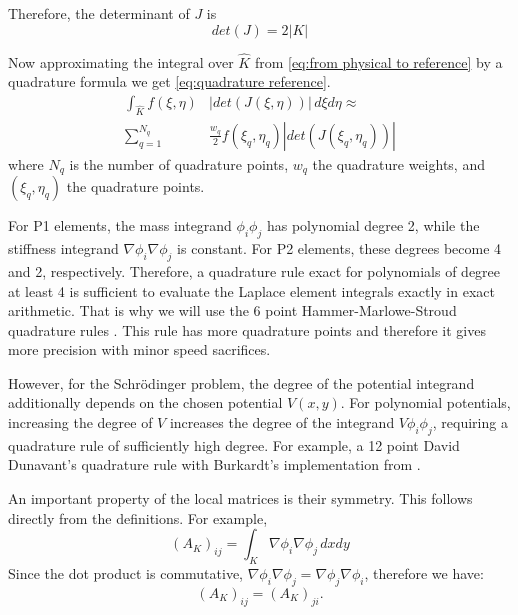 \documentclass[conference]{IEEEtran}
\begin{document}
Therefore, the determinant of $J$ is
\begin{equation}
    det(J) = 2|K|
\end{equation}

Now approximating the integral over $\hat{K}$ from \ref{eq:from physical to reference} by a quadrature formula we get \ref{eq:quadrature reference}.
\begin{equation}
\begin{aligned}
    \int_{\hat{K}}f(\xi, \eta) &|det(J(\xi, \eta))| \, d\xi d\eta \approx \\
    \sum_{q=1}^{N_q} &\frac{w_q}{2} f(\xi_q, \eta_q) |det(J(\xi_q, \eta_q))|
    \label{eq:quadrature reference}
\end{aligned}
\end{equation}
where $N_q$ is the number of quadrature points, $w_q$ the quadrature weights, and $(\xi_q, \eta_q)$ the quadrature points.

For P1 elements, the mass integrand $\phi_i\phi_j$ has polynomial degree 2, while the stiffness integrand $\nabla\phi_i \nabla\phi_j$ is constant. For P2 elements, these degrees become 4 and 2, respectively. Therefore, a quadrature rule exact for polynomials of degree at least 4 is sufficient to evaluate the Laplace element integrals exactly in exact arithmetic. That is why we will use the 6 point Hammer-Marlowe-Stroud quadrature rules \cite{b16}. This rule has more quadrature points and therefore it gives more precision with minor speed sacrifices.

However, for the Schr\"{o}dinger problem, the degree of the potential integrand additionally depends on the chosen potential $V(x,y)$. For polynomial potentials, increasing the degree of $V$ increases the degree of the integrand $V\phi_i\phi_j$, requiring a quadrature rule of sufficiently high degree. For example, a 12 point David Dunavant's quadrature rule \cite{b17} with Burkardt's implementation from \cite{b18}.

An important property of the local matrices is their symmetry. This follows directly from the definitions. For example,
\begin{equation}
    (A_K)_{ij} = \int_K\nabla\phi_i \nabla\phi_j \, dxdy
\end{equation}
Since the dot product is commutative, $\nabla\phi_i \nabla\phi_j = \nabla\phi_j \nabla\phi_i$, therefore we have:
\begin{equation}
    (A_K)_{ij}=(A_K)_{ji}.
\end{equation}
\end{document}
